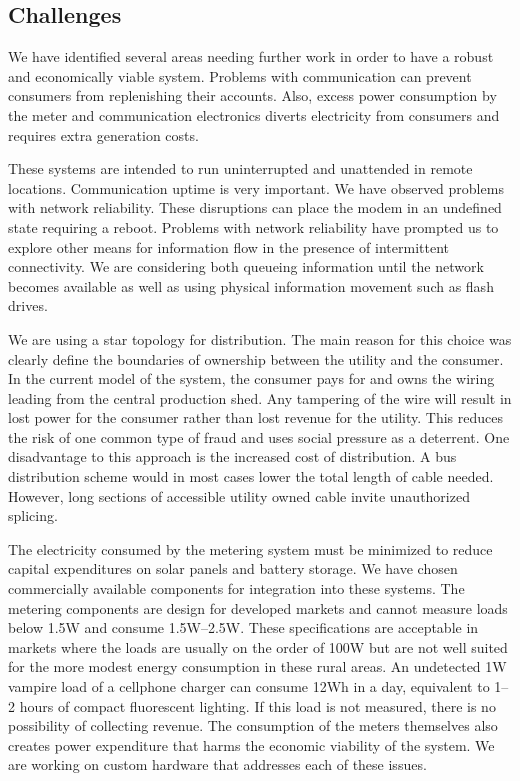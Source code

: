 \documentclass[conference]{IEEEtran}
\begin{document}
\subsection{Challenges}
We have identified several areas needing further work in order to have 
a robust and economically viable system.  Problems with communication
can prevent consumers from replenishing their accounts.  Also, excess
power consumption by the meter and communication electronics diverts 
electricity from consumers and requires extra generation costs.

These systems are intended to run uninterrupted and unattended in 
remote locations.  Communication uptime is very important.  We have 
observed problems with network reliability.  These disruptions can
place the modem in an undefined state requiring a reboot.  
Problems with network reliability have prompted us to explore other 
means for information flow in the presence of intermittent connectivity.
We are considering both queueing information until the network becomes
available as well as using physical information movement such as flash
drives.

We are using a star topology for distribution.  The main reason for this
choice was clearly define the boundaries of ownership between the utility
and the consumer.  In the current model of the system, the consumer pays for
and owns the wiring leading from the central production shed.  Any tampering
of the wire will result in lost power for the consumer rather than lost 
revenue for the utility.  This reduces the risk of one common type of fraud
and uses social pressure as a deterrent.
One disadvantage to this approach is the increased cost of distribution.
A bus distribution scheme would in most cases lower the total length of 
cable needed.  However, long sections of accessible utility owned cable 
invite unauthorized splicing.


The electricity consumed by the metering system must be minimized to 
reduce capital expenditures on solar panels and battery storage.  We 
have chosen commercially available components for integration into
these systems.  The metering components are design for developed markets
and cannot measure loads below 1.5W and consume 1.5W--2.5W.  These 
specifications are acceptable in markets where the loads are usually
on the order of 100W but are not well suited for the more modest 
energy consumption in these rural areas.  An undetected 1W vampire load of a
cellphone charger can consume 12Wh in a day, equivalent to 1--2 hours
of compact fluorescent lighting.  If this load is not measured, there 
is no possibility of collecting revenue.  The consumption of the meters
themselves also creates power expenditure that harms the economic viability
of the system.  We are working on custom hardware that addresses each 
of these issues.
\end{document}
